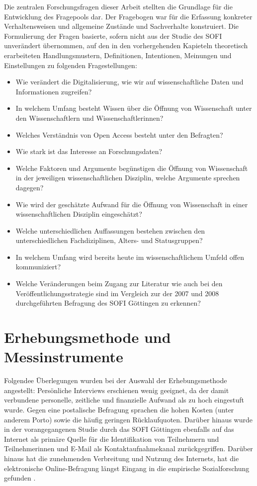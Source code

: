Die zentralen Forschungsfragen dieser Arbeit stellten die Grundlage für die Entwicklung des Fragepools dar. Der Fragebogen war für die Erfassung konkreter Verhaltensweisen und allgemeine Zustände und Sachverhalte \cite{raab_2012_fragebogen} konstruiert. Die Formulierung der Fragen basierte, sofern nicht aus der Studie des SOFI unverändert übernommen, auf den in den vorhergehenden Kapieteln theoretisch erarbeiteten Handlungsmustern, Definitionen, Intentionen, Meinungen und Einstellungen zu folgenden Fragestellungen:
\begin{itemize}
\item Wie verändert die Digitalisierung, wie wir auf wissenschaftliche Daten und Informationen zugreifen?
\item In welchem Umfang besteht Wissen über die Öffnung von Wissenschaft unter den Wissenschaftlern und Wissenschaftlerinnen? 
\item Welches Verständnis von Open Access besteht unter den Befragten? 
\item Wie stark ist das Interesse an Forschungsdaten? 
\item Welche Faktoren und Argumente begünstigen die Öffnung von Wissenschaft in der jeweiligen wissenschaftlichen Disziplin, welche Argumente sprechen dagegen? 
\item Wie wird der geschätzte Aufwand für die Öffnung von Wissenschaft in einer wissenschaftlichen Disziplin eingeschätzt?
\item Welche unterschiedlichen Auffassungen bestehen zwischen den unterschiedlichen Fachdiziplinen, Alters- und Statusgruppen?
\item In welchem Umfang wird bereits heute im wissenschaftlichem Umfeld offen kommuniziert?
\item Welche Veränderungen beim Zugang zur Literatur wie auch bei den Veröffentlichungsstrategie sind im Vergleich zur der 2007 und 2008 durchgeführten Befragung des SOFI Göttingen zu erkennen?
\end{itemize}

\section{Erhebungsmethode und Messinstrumente}

Folgendee Überlegungen wurden bei der Auswahl der Erhebungsmethode angestellt: Persönliche Interviews erschienen wenig geeignet, da der damit verbundene personelle, zeitliche und finanzielle Aufwand als zu hoch eingestuft wurde. Gegen eine postalische Befragung sprachen die hohen Kosten (unter anderem Porto) sowie die häufig geringen Rücklaufquoten. Darüber hinaus wurde in der vorangegangenen Studie durch das SOFI Göttingen ebenfalls auf das Internet als primäre Quelle für die Identifikation von Teilnehmern und Teilnehmerinnen und E-Mail als Kontaktaufnahmekanal zurückgegriffen. Darüber hinaus hat die zunehmenden Verbreitung und Nutzung des Internets, hat die elektronische Online-Befragung längst Eingang in die empirische Sozialforschung gefunden \cite{Pannewitz_2002}. 


